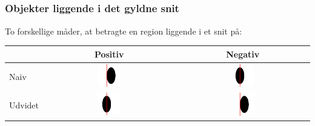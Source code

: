 \documentclass[xcolor=table]{beamer}
\begin{document}
\subsection*{}
\begin{frame}

    \frametitle{Objekter liggende i det gyldne snit}

    To forskellige måder, at betragte en region liggende i et snit på:

    \begin{center}
        \begin{tabular}{l|cc}
            & Positiv & Negativ\\\hline
            Naiv    & \includegraphics[width=0.18\textwidth]{billeder/pnaiv_nudvidet} & \includegraphics[width=0.18\textwidth]{billeder/pudvidet_nnaiv}\\
            Udvidet & \includegraphics[width=0.18\textwidth]{billeder/pudvidet_nnaiv} & \includegraphics[width=0.18\textwidth]{billeder/pnaiv_nudvidet}
        \end{tabular}
    \end{center}

\end{frame}
\end{document}
